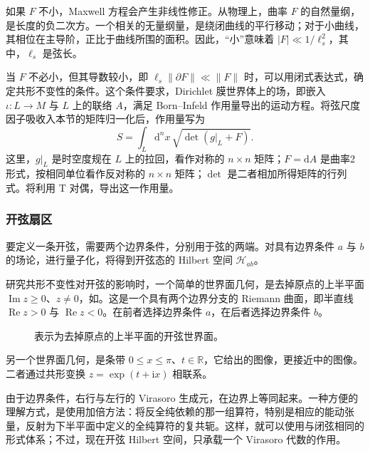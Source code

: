 如果 $F$ 不小，Maxwell 方程会产生非线性修正。从物理上，曲率 $F$ 的自然量纲，是长度的负二次方。一个相关的无量纲量，是绕闭曲线的平行移动；对于小曲线，其相位在主导阶，正比于曲线所围的面积。因此，“小”意味着 $|F|\ll1/\ell_s^2$，其中，$\ell_s$ 是弦长。

当 $F$ 不必小，但其导数较小，即 $\ell_s\|\partial F\|\ll\|F\|$ 时，可以用闭式表达式，确定共形不变性的条件。这个条件要求，Dirichlet 膜世界体上的场，即嵌入 $\iota\colon L\to M$ 与 $L$ 上的联络 $A$，满足 Born--Infeld 作用量导出的运动方程。将弦尺度因子吸收入本节的矩阵归一化后，作用量写为
\begin{equation}\label{eq:3.142}
S=\int_L\mathrm{d}^nx\,\sqrt{\det(g|_L+F)}.
\end{equation}
这里，$g|_L$ 是时空度规在 $L$ 上的拉回，看作对称的 $n\times n$ 矩阵；$F=\mathrm{d}A$ 是曲率2形式，按相同单位看作反对称的 $n\times n$ 矩阵；$\det$ 是二者相加所得矩阵的行列式。将利用 T 对偶，导出这一作用量。

\subsubsection{开弦扇区}\label{sec:3.5.2.5}

要定义一条开弦，需要两个边界条件，分别用于弦的两端。对具有边界条件 $a$ 与 $b$ 的场论，进行量子化，将得到开弦态的 Hilbert 空间 $\mathcal{H}_{ab}$。

研究共形不变性对开弦的影响时，一个简单的世界面几何，是去掉原点的上半平面 $\operatorname{Im}z\ge0$、$z\ne0$，如。这是一个具有两个边界分支的 Riemann 曲面，即半直线 $\operatorname{Re}z>0$ 与 $\operatorname{Re}z<0$。在前者选择边界条件 $a$，在后者选择边界条件 $b$。
\begin{figure}[H]
\centering
{}
\caption{表示为去掉原点的上半平面的开弦世界面。}\label{fig:3.5}
\end{figure}

另一个世界面几何，是条带 $0\le x\le\pi$、$t\in\mathbb{R}$，它给出的图像，更接近中的图像。二者通过共形变换 $z=\exp(t+\mathrm{i}x)$ 相联系。

由于边界条件，右行与左行的 Virasoro 生成元，在边界上等同起来。一种方便的理解方式，是使用加倍方法：将反全纯依赖的那一组算符，特别是相应的能动张量，反射为下半平面中定义的全纯算符的复共轭。这样，就可以使用与闭弦相同的形式体系；不过，现在开弦 Hilbert 空间，只承载一个 Virasoro 代数的作用。

